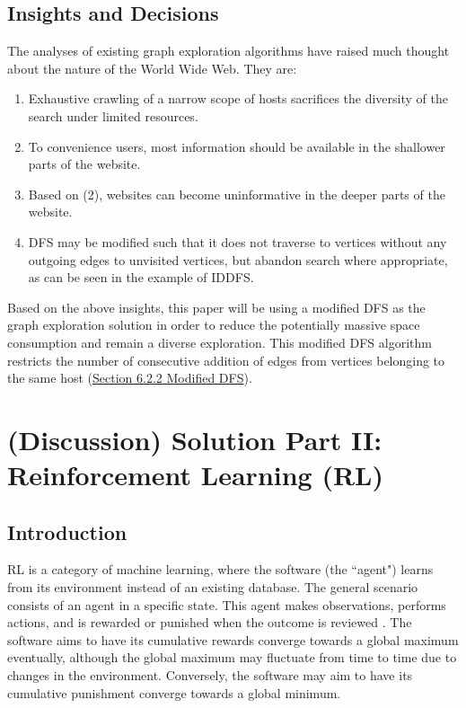 \documentclass{article}
\begin{document}
\subsection{Insights and Decisions}
\label{sec:3.6}
The analyses of existing graph exploration algorithms have raised much thought about the nature of the World Wide Web. They are:
\begin{enumerate}
	\item Exhaustive crawling of a narrow scope of hosts sacrifices the diversity of the search under limited resources.
	\item To convenience users, most information should be available in the shallower parts of the website.
	\item Based on (2), websites can become uninformative in the deeper parts of the website.
	\item DFS may be modified such that it does not traverse to vertices without any outgoing edges to unvisited vertices, but abandon search where appropriate, as can be seen in the example of IDDFS.
\end{enumerate}
Based on the above insights, this paper will be using a modified DFS as the graph exploration solution in order to reduce the potentially massive space consumption and remain a diverse exploration. This modified DFS algorithm restricts the number of consecutive addition of edges from vertices belonging to the same host (\hyperref[sec:6.2.2]{Section 6.2.2 Modified DFS}).
\newpage

\section{(Discussion) Solution Part II: Reinforcement Learning (RL)}
\subsection{Introduction}
RL is a category of machine learning, where the software (the ``agent") learns from its environment instead of an existing database. The general scenario consists of an agent in a specific state. This agent makes observations, performs actions, and is rewarded or punished when the outcome is reviewed \cite{bib-07}. The software aims to have its cumulative rewards converge towards a global maximum eventually, although the global maximum may fluctuate from time to time due to changes in the environment. Conversely, the software may aim to have its cumulative punishment converge towards a global minimum.
\medskip
\end{document}
